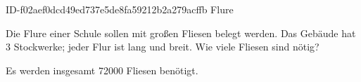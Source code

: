 \begin{exercise}
      {ID-f02aef0dcd49ed737e5de8fa59212b2a279acffb}
      {Flure}
  \ifproblem\problem\par
    Die Flure einer Schule sollen mit  großen Fliesen belegt werden.
    Das Gebäude hat \num{3} Stockwerke; jeder Flur ist  lang und 
    breit. Wie viele Fliesen sind nötig?
  \fi
  \ifoutcome\outcome\par
    Es werden insgesamt \num{72000} Fliesen benötigt.
  \fi
\end{exercise}
